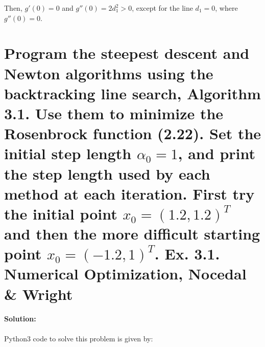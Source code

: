 \documentclass[10pt]{article}
\begin{document}
Then, $g'(0) = 0$ and $g''(0) = 2 d_1^2 > 0$, except for the line $d_1 = 0$, where $g''(0) = 0$.\\



\hfill \break %

\section{Program the steepest descent and Newton algorithms using the backtracking line search, Algorithm 3.1.
Use them to minimize the Rosenbrock function (2.22). Set the initial step length
$\alpha_0= 1$, and print the step length used by each method at each iteration. First try the initial point
$x_0 = (1.2, 1.2)^T$ and then the more difficult starting point $x_0 = (-1.2, 1)^T$. Ex. 3.1. Numerical Optimization, Nocedal \& Wright}


\paragraph{Solution:}

Python3 code to solve this problem is given by:
\end{document}
